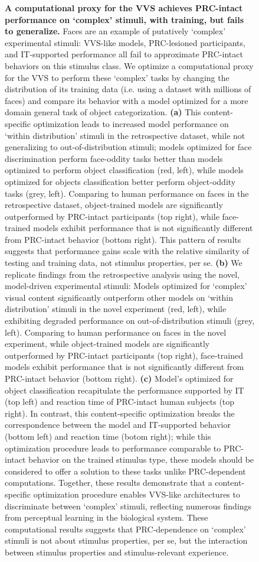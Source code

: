 \documentclass[11pt]{article}
\begin{document}
\begin{figure}[ht]
\caption{\textbf{A computational proxy for the VVS achieves PRC-intact performance on `complex' stimuli, with training, but fails to generalize.} Faces are an example of putatively ‘complex’ experimental stimuli: VVS-like models, PRC-lesioned participants, and IT-supported performance all fail to approximate PRC-intact behaviors on this stimulus class. We optimize a computational proxy for the VVS to perform these ‘complex’ tasks by changing the distribution of its training data (i.e. using a dataset with millions of faces) and compare its behavior with a model optimized for a more domain general task of object categorization. \textbf{(a)} This content-specific optimization leads to increased model performance on `within distribution' stimuli in the retrospective dataset, while not generalizing to out-of-distribution stimuli; models optimized for face discrimination perform face-oddity tasks better than models optimized to perform object classification (red, left), while models optimized for objects classification better perform object-oddity tasks (grey, left). Comparing to human performance on faces in the retrospective dataset, object-trained models are significantly outperformed by PRC-intact participants (top right), while face-trained models exhibit performance that is not significantly different from PRC-intact behavior (bottom right). This pattern of results suggests that performance gains scale with the relative similarity of testing and training data, not stimulus properties, per se. \textbf{(b)} We replicate findings from the retrospective analysis using the novel, model-driven experimental stimuli: Models optimized for ‘complex’ visual content significantly outperform other models on ‘within distribution’ stimuli in the novel experiment (red, left), while exhibiting degraded performance on out-of-distribution stimuli (grey, left). Comparing to human performance on faces in the novel experiment, while object-trained models are significantly outperformed by PRC-intact participants (top right), face-trained models exhibit performance that is not significantly different from PRC-intact behavior (bottom right). \textbf{(c)} Model’s optimized for object classification recapitulate the performance supported by IT (top left) and reaction time of PRC-intact human subjects (top right). In contrast, this content-specific optimization breaks the correspondence between the model and IT-supported behavior (bottom left) and reaction time (botom right); while this optimization procedure leads to performance comparable to PRC-intact behavior on the trained stimulus type, these models should be considered to offer a solution to these tasks unlike PRC-dependent computations. Together, these results demonstrate that a content-specific optimization procedure enables VVS-like architectures to discriminate between `complex' stimuli, reflecting numerous findings from perceptual learning in the biological system. These computational results suggests that PRC-dependence on `complex' stimuli is not about stimulus properties, per se, but the interaction between stimulus properties and stimulus-relevant experience.
}
\end{figure}
\end{document}
